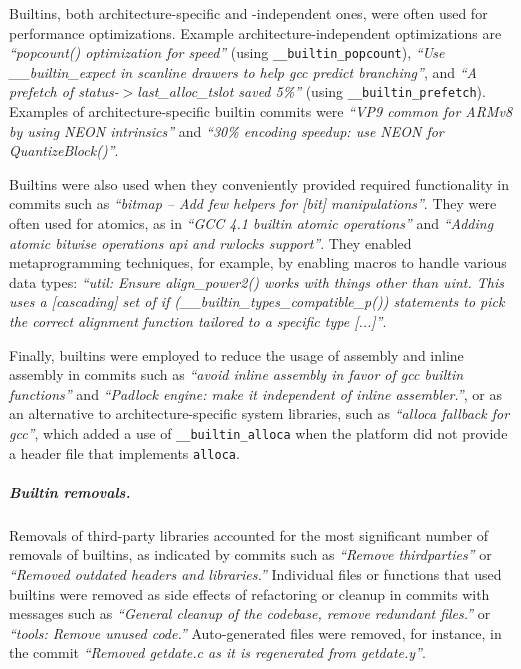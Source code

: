 \documentclass[sigconf,screen]{acmart}
\newcommand\code[1]{\texttt{#1}}
\newcommand\quotecommit[1]{\emph{``#1''}}
\begin{document}
Builtins, both architecture-specific and -independent ones, were often used for performance optimizations.
Example architecture-independent optimizations are 
\quotecommit{popcount() optimization for speed} (using \code{\_\_builtin\_popcount}), \quotecommit{Use \_\_builtin\_expect in scanline drawers to help gcc predict branching}, and \quotecommit{A prefetch of status-$>$last\_alloc\_tslot saved 5\%} (using \code{\_\_builtin\_prefetch}).
Examples of architecture-specific builtin commits were \quotecommit{VP9 common for ARMv8 by using NEON intrinsics} and \quotecommit{30\% encoding speedup: use NEON for QuantizeBlock()}.

Builtins were also used when they conveniently provided required functionality in commits such as \quotecommit{bitmap -- Add few helpers for [bit] manipulations}.
They were often used for atomics, as in \quotecommit{GCC 4.1 builtin atomic operations} and \quotecommit{Adding atomic bitwise operations api and rwlocks support}.
They enabled metaprogramming techniques, for example, by enabling macros to handle various data types: \quotecommit{util: Ensure align\_power2() works with things other than uint. This uses a [cascading] set of if (\_\_builtin\_types\_compatible\_p()) statements to pick the correct alignment function tailored to a specific type [...]}.

Finally, builtins were employed to reduce the usage of assembly and inline assembly in commits such as \quotecommit{avoid inline assembly in favor of gcc builtin functions} and \quotecommit{Padlock engine: make it independent of inline assembler.}, or as an alternative to architecture-specific system libraries, such as \quotecommit{alloca fallback for gcc}, which added a use of \code{\_\_builtin\_alloca} when the platform did not provide a header file that implements \code{alloca}.

\subparagraph{\indent\emph{Builtin removals.}}
Removals of third-party libraries accounted for the most significant number of removals of builtins, as indicated by commits such as \quotecommit{Remove thirdparties} or \quotecommit{Removed outdated headers and libraries.}
Individual files or functions that used builtins were removed as side effects of refactoring or cleanup in commits with messages such as \quotecommit{General cleanup of the codebase, remove redundant files.} or \quotecommit{tools: Remove unused code.}
Auto-generated files were removed, for instance, in the commit \quotecommit{Removed getdate.c as it is regenerated from getdate.y}.
\end{document}
